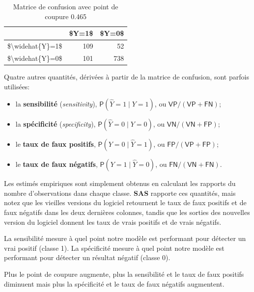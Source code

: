\documentclass[
  11pt,
  letterpaper,
]{book}
\providecommand{\tightlist}{%
  \setlength{\itemsep}{0pt}\setlength{\parskip}{0pt}}
\theoremstyle{definition}
\theoremstyle{definition}
\theoremstyle{definition}
\theoremstyle{remark}
\begin{document}
\begin{table}

\caption{\label{tab:confumat}Matrice de confusion avec point de coupure 0.465}
\centering
\begin{tabular}[t]{l|r|r}
\hline
  & \$Y=1\$ & \$Y=0\$\\
\hline
\$\textbackslash{}widehat\{Y\}=1\$ & 109 & 52\\
\hline
\$\textbackslash{}widehat\{Y\}=0\$ & 101 & 738\\
\hline
\end{tabular}
\end{table}

Quatre autres quantités, dérivées à partir de la matrice de confusion, sont parfois utilisées:

\begin{itemize}
\tightlist
\item
  la \textbf{sensibilité} (\emph{sensitivity}), \({\mathsf P}\left(\widehat{Y}=1 \mid Y=1\right)\), ou \(\mathsf{VP}/(\mathsf{VP}+\mathsf{FN})\);
\item
  la \textbf{spécificité} (\emph{specificity}), \({\mathsf P}\left(\widehat{Y}=0 \mid Y=0\right)\), ou \(\mathsf{VN}/(\mathsf{VN}+\mathsf{FP})\);
\item
  le \textbf{taux de faux positifs}, \({\mathsf P}\left(Y=0 \mid \widehat{Y}=1\right)\), ou \(\mathsf{FP}/(\mathsf{VP}+\mathsf{FP})\);
\item
  le \textbf{taux de faux négatifs}, \({\mathsf P}\left(Y=1 \mid \widehat{Y}=0\right)\), ou \(\mathsf{FN}/(\mathsf{VN}+\mathsf{FN})\).
\end{itemize}

Les estimés empiriques sont simplement obtenus en calculant les rapports du nombre d'observations dans chaque classe. \textbf{SAS} rapporte ces quantités, mais notez que les vieilles versions du logiciel retournent le taux de faux positifs et de faux négatifs dans les deux dernières colonnes, tandis que les sorties des nouvelles version du logiciel donnent les taux de vrais positifs et de vrais négatifs.

La sensibilité mesure à quel point notre modèle est performant pour détecter un vrai positif (classe 1). La spécificité mesure à quel point notre modèle est performant pour détecter un résultat négatif (classe 0).

Plus le point de coupure augmente, plus la sensibilité et le taux de faux positifs diminuent mais plus la spécificité et le taux de faux négatifs augmentent.
\end{document}
